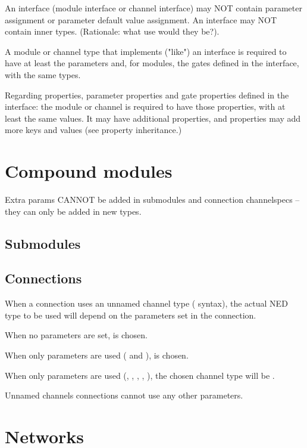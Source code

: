 An interface (module interface or channel interface) may NOT contain
parameter assignment or parameter default value assignment. An interface
may NOT contain inner types. (Rationale: what use would they be?).

A module or channel type that implements ("like") an interface is
required to have at least the parameters and, for modules, the gates
defined in the interface, with the same types.

Regarding properties, parameter properties and gate properties defined
in the interface: the module or channel is required to have those properties,
with at least the same values. It may have additional properties,
and properties may add more keys and values (see property inheritance.)


\section{Compound modules}

Extra params CANNOT be added in submodules and connection channelspecs --
they can only be added in new types.

\subsection{Submodules}

\subsection{Connections}

When a connection uses an unnamed channel type (\ttt{-->
\{\ldots\} -->} syntax), the actual NED type to be used will depend on the
parameters set in the connection.

When no parameters are set,  is chosen. 

When only  parameters are used ( 
and ),  is chosen. 

When only  parameters are used
(, , , , ),
the chosen channel type will be .

Unnamed channels connections cannot use any other parameters.  

\section{Networks}

